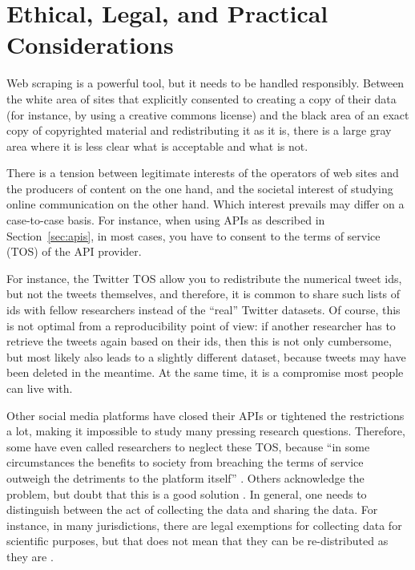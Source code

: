 

%

\section{Ethical, Legal, and Practical Considerations}
\label{sec:ethicallegalpractical}
Web scraping is a powerful tool, but it needs to be handled
responsibly. Between the white area of sites that explicitly consented
to creating a copy of their data (for instance, by using a creative
commons license) and the black area of an exact copy of copyrighted
material and redistributing it as it is, there is a large gray area
where it is less clear what is acceptable and what is not.

There is a tension between legitimate interests of the operators of
web sites and the producers of content on the one hand, and the
societal interest of studying online communication on the other
hand. Which interest prevails may differ on a case-to-case basis. For
instance, when using APIs as described in Section~\ref{sec:apis}, in most
cases, you have to consent to the terms of service (TOS) of the API
provider.

For instance, the Twitter TOS allow you to redistribute the numerical
tweet ids, but not the tweets themselves, and therefore, it is common
to share such lists of ids with fellow researchers instead of the
``real'' Twitter datasets. Of course, this is not optimal from a
reproducibility point of view: if another researcher has to retrieve
the tweets again based on their ids, then this is not only cumbersome,
but most likely also leads to a slightly different dataset, because
tweets may have been deleted in the meantime. At the same time, it is
a compromise most people can live with.

Other social media platforms have closed their APIs or tightened the
restrictions a lot, making it impossible to study many pressing
research questions. Therefore, some have even called researchers to
neglect these TOS, because ``in some circumstances the benefits to
society from breaching the terms of service outweigh the detriments to
the platform itself'' \citep[p.~1561]{Bruns2019}. Others acknowledge
the problem, but doubt that this is a good solution
\citep{Puschmann2019}.
In general, one needs to distinguish between the act of collecting the
data and sharing the data. For instance, in many jurisdictions, there
are legal exemptions for collecting data for scientific purposes, but
that does not mean that they can be re-distributed as they are
\citep{VanAtteveldt2019}.

